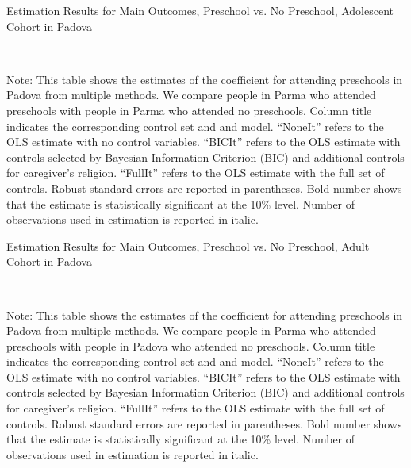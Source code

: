\begin{table}[H] \caption{Estimation Results for Main Outcomes, Preschool vs. No Preschool, Adolescent Cohort in Padova} \label{ols-M-adol-reg-pres-padova}
\scalebox{0.8}{}
\vspace{1ex} \\
\footnotesize\raggedright{Note: This table shows the estimates of the coefficient for attending preschools in Padova from multiple methods. We compare people in Parma who attended preschools with people in Parma who attended no preschools. Column title indicates the corresponding control set and and model. ``NoneIt'' refers to the OLS estimate with no control variables. ``BICIt'' refers to the OLS estimate with controls selected by Bayesian Information Criterion (BIC) and additional controls for caregiver's religion. ``FullIt'' refers to the OLS estimate with the full set of controls. Robust standard errors are reported in parentheses. Bold number shows that the estimate is statistically significant at the 10\% level. Number of observations used in estimation is reported in italic.}

\end{table}

\begin{table}[H] \caption{Estimation Results for Main Outcomes, Preschool vs. No Preschool, Adult Cohort in Padova} \label{ols-M-adult-reg-pres-padova}
\scalebox{0.8}{}
\vspace{1ex} \\
\footnotesize\raggedright{Note: This table shows the estimates of the coefficient for attending preschools in Padova from multiple methods. We compare people in Parma who attended preschools with people in Padova who attended no preschools. Column title indicates the corresponding control set and and model. ``NoneIt'' refers to the OLS estimate with no control variables. ``BICIt'' refers to the OLS estimate with controls selected by Bayesian Information Criterion (BIC) and additional controls for caregiver's religion. ``FullIt'' refers to the OLS estimate with the full set of controls. Robust standard errors are reported in parentheses. Bold number shows that the estimate is statistically significant at the 10\% level. Number of observations used in estimation is reported in italic.}

\end{table}
















